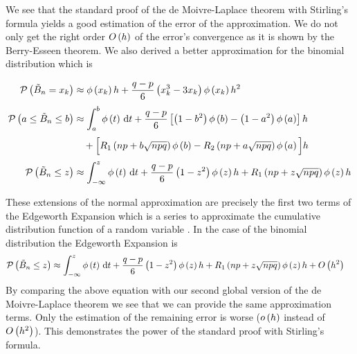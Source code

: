 We see that the standard proof of the de Moivre-Laplace theorem with Stirling's formula yields a good estimation of the error of the approximation. We do not only get the right order $O\left( {h} \right)$ of the error's convergence as it is shown by the Berry-Esseen theorem. We also derived a better approximation for the binomial distribution which is

\begin{align}
  \P{\BBs = \x}& \approx \fphi{\x} h +\frac{q-p}6 \left(\x^3-3\x\right) \fphi{\x} h^2 \nl
  \P{a \le \BBs \le b} & \approx  \int_a^b \fphi{t} \d{t} + \frac{q-p}6 \left[\br{1-b^2}\fphi{b}-\br{1-a^2}\fphi{a}\right] h \nl
  & \quad +\Big[\Ro{np + b\sqrt{npq}}\fphi{b} - \Rt{np + a \sqrt{npq}}\fphi{a}\Big]h \nl
  \P{\BBs \le z} & \approx \int_{-\infty}^z \fphi{t} \d{t} + \frac{q-p}6 \br{1-z^2}\fphi{z} h + \Ro{np+z\sqrt{npq}} \fphi{z} h 
\end{align}

These extensions of the normal approximation are precisely the first two terms of the Edgeworth Expansion  which is a series to approximate the cumulative distribution function of a random variable \cite[pp. 39 ff.]{hall}\cite{wiki:edgeworth}. In the case of the binomial distribution the Edgeworth Expansion is \cite[p. 46]{hall}
\begin{align}
  \mathcal P\left({\tilde B_{n} \le z}\right) & \approx \int_{-\infty}^z \phi\left( {t} \right) \,\mathrm d{t} + \frac{q-p}6 \left( {1-z^2} \right)\phi\left( {z} \right) h + R_1\left({np + z \sqrt{npq}}\right)\phi\left( {z} \right)h + O\left( {h^2} \right)
\end{align}
By comparing the above equation with our second global version of the de Moivre-Laplace theorem we see that we can provide the same approximation terms. Only the estimation of the remaining error is worse ($o\left( {h} \right)$ instead of $O\left( {h^2} \right)$). This demonstrates the power of the standard proof with Stirling's formula.



